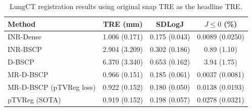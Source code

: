 \begin{table}[t]
\centering
\caption{LungCT registration results using original snap TRE as the headline TRE.}
\label{tab:lungct10-publication}
\begin{tabular}{lccc}
\toprule
Method & TRE (mm) & SDLogJ & $J\leq 0$ (\%) \\
\midrule
INR-Dense & 1.006 (0.171) & 0.175 (0.043) & 0.0089 (0.0250) \\
INR-BSCP & 2.904 (3.209) & 0.302 (0.186) & 0.89 (1.10) \\
D-BSCP & 6.370 (3.340) & 0.653 (0.162) & 3.94 (1.75) \\
MR-D-BSCP & 0.966 (0.151) & 0.185 (0.061) & 0.0037 (0.0081) \\
MR-D-BSCP (pTVReg loss) & 0.922 (0.152) & 0.180 (0.050) & 0.0138 (0.0193) \\
pTVReg (SOTA) & 0.919 (0.152) & 0.198 (0.057) & 0.0278 (0.0321) \\
\bottomrule
\end{tabular}
\end{table}
